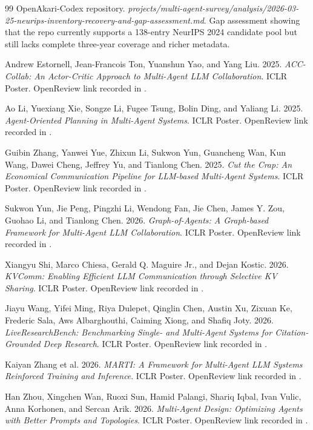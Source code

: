 \documentclass[11pt]{article}
\begin{document}
\begin{thebibliography}{99}
OpenAkari-Codex repository. \emph{projects/multi-agent-survey/analysis/2026-03-25-neurips-inventory-recovery-and-gap-assessment.md}. Gap assessment showing that the repo currently supports a 138-entry NeurIPS 2024 candidate pool but still lacks complete three-year coverage and richer metadata.

Andrew Estornell, Jean-Francois Ton, Yuanshun Yao, and Yang Liu. 2025. \emph{ACC-Collab: An Actor-Critic Approach to Multi-Agent LLM Collaboration}. ICLR Poster. OpenReview link recorded in \cite{iclr_subset}.

Ao Li, Yuexiang Xie, Songze Li, Fugee Tsung, Bolin Ding, and Yaliang Li. 2025. \emph{Agent-Oriented Planning in Multi-Agent Systems}. ICLR Poster. OpenReview link recorded in \cite{iclr_subset}.

Guibin Zhang, Yanwei Yue, Zhixun Li, Sukwon Yun, Guancheng Wan, Kun Wang, Dawei Cheng, Jeffrey Yu, and Tianlong Chen. 2025. \emph{Cut the Crap: An Economical Communication Pipeline for LLM-based Multi-Agent Systems}. ICLR Poster. OpenReview link recorded in \cite{iclr_subset}.

Sukwon Yun, Jie Peng, Pingzhi Li, Wendong Fan, Jie Chen, James Y. Zou, Guohao Li, and Tianlong Chen. 2026. \emph{Graph-of-Agents: A Graph-based Framework for Multi-Agent LLM Collaboration}. ICLR Poster. OpenReview link recorded in \cite{iclr_subset}.

Xiangyu Shi, Marco Chiesa, Gerald Q. Maguire Jr., and Dejan Kostic. 2026. \emph{KVComm: Enabling Efficient LLM Communication through Selective KV Sharing}. ICLR Poster. OpenReview link recorded in \cite{iclr_subset}.

Jiayu Wang, Yifei Ming, Riya Dulepet, Qinglin Chen, Austin Xu, Zixuan Ke, Frederic Sala, Aws Albarghouthi, Caiming Xiong, and Shafiq Joty. 2026. \emph{LiveResearchBench: Benchmarking Single- and Multi-Agent Systems for Citation-Grounded Deep Research}. ICLR Poster. OpenReview link recorded in \cite{iclr_subset}.

Kaiyan Zhang et al. 2026. \emph{MARTI: A Framework for Multi-Agent LLM Systems Reinforced Training and Inference}. ICLR Poster. OpenReview link recorded in \cite{iclr_subset}.

Han Zhou, Xingchen Wan, Ruoxi Sun, Hamid Palangi, Shariq Iqbal, Ivan Vulic, Anna Korhonen, and Sercan Arik. 2026. \emph{Multi-Agent Design: Optimizing Agents with Better Prompts and Topologies}. ICLR Poster. OpenReview link recorded in \cite{iclr_subset}.


\end{thebibliography}
\end{document}
